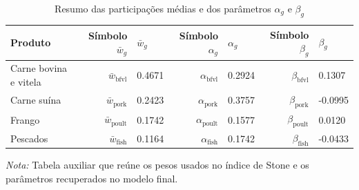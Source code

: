 
\begin{table}[H]
\centering
\caption{Resumo das participações médias e dos parâmetros $\alpha_g$ e $\beta_g$}
\label{tab:resumo-alpha-beta-wbar-excel}
\scriptsize
\begin{tabular}{@{}lrlrlrl@{}}
\toprule
Produto & Símbolo $\bar{w}_g$ & $\bar{w}_g$ & Símbolo $\alpha_g$ & $\alpha_g$ & Símbolo $\beta_g$ & $\beta_g$ \\
\midrule
Carne bovina e vitela & $\bar{w}_{\text{bfvl}}$ & 0.4671 & $\alpha_{\text{bfvl}}$ & 0.2924 & $\beta_{\text{bfvl}}$ & 0.1307 \\
Carne suína & $\bar{w}_{\text{pork}}$ & 0.2423 & $\alpha_{\text{pork}}$ & 0.3757 & $\beta_{\text{pork}}$ & -0.0995 \\
Frango & $\bar{w}_{\text{poult}}$ & 0.1742 & $\alpha_{\text{poult}}$ & 0.1577 & $\beta_{\text{poult}}$ & 0.0120 \\
Pescados & $\bar{w}_{\text{fish}}$ & 0.1164 & $\alpha_{\text{fish}}$ & 0.1742 & $\beta_{\text{fish}}$ & -0.0433 \\
\bottomrule
\end{tabular}
\par\vspace{0.35em}
\begin{minipage}{0.95\textwidth}\footnotesize \textit{Nota:} Tabela auxiliar que reúne os pesos usados no índice de Stone e os parâmetros recuperados no modelo final.\end{minipage}
\end{table}
